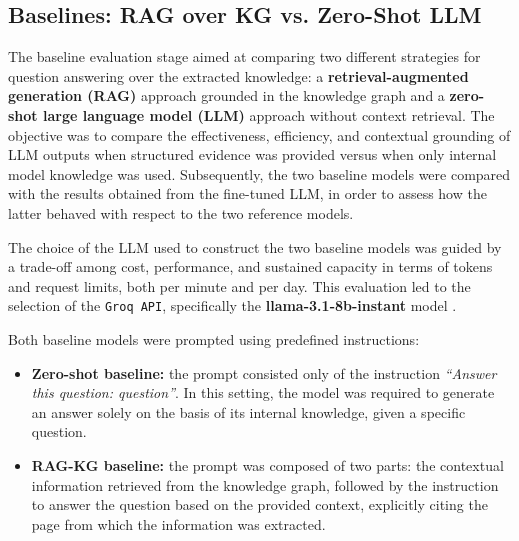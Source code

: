 \subsection{Baselines: RAG over KG vs. Zero-Shot LLM}
The baseline evaluation stage aimed at comparing two different strategies for question answering over the extracted knowledge: a \textbf{retrieval-augmented generation (RAG)} \cite{whatRAG} \cite{RAGsurvey} approach grounded in the knowledge graph and a \textbf{zero-shot large language model (LLM)} \cite{llmzeroshot} approach without context retrieval. The objective was to compare the effectiveness, efficiency, and contextual grounding of LLM outputs when structured evidence was provided versus when only internal model knowledge was used. Subsequently, the two baseline models were compared with the results obtained from the fine-tuned LLM, in order to assess how the latter behaved with respect to the two reference models.

The choice of the LLM used to construct the two baseline models was guided by a trade-off among cost, performance, and sustained capacity in terms of tokens and request limits, both per minute and per day. This evaluation led to the selection of the \texttt{Groq API}, specifically the \textbf{llama-3.1-8b-instant} model \cite{llama3}.

Both baseline models were prompted using predefined instructions:
\begin{itemize}
\item \textbf{Zero-shot baseline:} the prompt consisted only of the instruction \textit{“Answer this question: {question}”}. In this setting, the model was required to generate an answer solely on the basis of its internal knowledge, given a specific question.
\item \textbf{RAG-KG baseline:} the prompt was composed of two parts: the contextual information retrieved from the knowledge graph, followed by the instruction to answer the question based on the provided context, explicitly citing the page from which the information was extracted.
\end{itemize}


